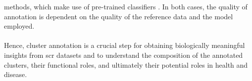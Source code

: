 methods, which make use of pre-trained classifiers \textbf{\cite{dominguez_conde_cross-tissue_2022,fu_clustifyr_2020}}. In both cases, the quality of annotation is dependent on the quality of the reference data and the model employed.\\\\
Hence, cluster annotation is a crucial step for obtaining biologically meaningful insights from \gls{scr} datasets and to understand the composition of the annotated clusters, their functional roles, and ultimately their potential roles in health and disease.


